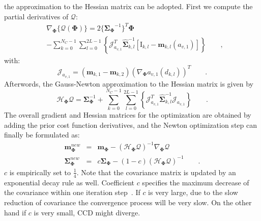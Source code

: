 \documentclass[conference]{IEEEtran}
\begin{document}
the approximation to the Hessian matrix can be adopted. First we
compute the partial derivatives of $\mathcal{Q}$:
\begin{equation}
\label{eq:partcost}
\begin{aligned}
&\nabla_{\mathbf{\Phi}}\{{\mathcal{Q}(\mathbf{\Phi})}\} =
2\{{\mathbf{\Sigma}_{\mathbf{\Phi}}}^{-1}\}^{T}{\mathbf{\Phi}}\\ 
&- \sum_{k = 0}^{N_{C}-1} \sum_{l=0}^{2L-1} \left\{\mathcal{J}_{a_{v,1}}^T\hat{\mathbf{\Sigma}}_{k,l}^{-1}\left[\mathrm{I}_{k,l}-\hat{\mathbf{m}}_{k,l}(a_{v,1})\right]\right\}\qquad,
\end{aligned}
\end{equation}
with:
\begin{equation}
  \label{eq:jocob}
  \mathcal{J}_{a_{v,1}} = \left( \mathbf{m}_{k,1} -\mathbf{m}_{k,2} \right)(\nabla_{\mathbf{\Phi}} a_{v,1}(d_{k,l}))^T\qquad.
\end{equation}
Afterwords, the Gauss-Newton approximation to the Hessian
matrix is given by
\begin{equation}
  \label{eq:hessian}
  \mathcal{H}_{\mathbf{\Phi}} \mathcal{Q}  =
  \mathbf{\Sigma}_{\mathbf{\Phi}}^{-1} + \sum_{k = 0}^{N_{C}-1}
  \sum_{l=0}^{2L-1} \left\{\mathcal{J}_{a_{v,1}}^T\hat{\mathbf{\Sigma}}_{k,l}^{-1}\mathcal{J}_{a_{v,1}}\right\}\qquad.
\end{equation}
The overall gradient and Hessian matrices for the optimization
are obtained by adding the prior cost function
derivatives, and the Newton optimization step can finally be
formulated as:
\begin{eqnarray}
\label{eq:newton}
  \mathbf{m}_{\mathbf{\Phi}}^{new} & = &
  \mathbf{m}_{\mathbf{\Phi}} - (\mathcal{H}_{\mathbf{\Phi}}
  \mathcal{Q})^{-1} \nabla_{\mathbf{\Phi}} \mathcal{Q} \nonumber \\
  \mathbf{\Sigma}_{\mathbf{\Phi}}^{new} & = &
  c\mathbf{\Sigma}_{\mathbf{\Phi}} - (1-c)(\mathcal{H}_{\mathbf{\Phi}}
  \mathcal{Q})^{-1}\qquad.
\end{eqnarray}
$c$ is empirically set to $\frac{1}{4}$. Note that the covariance
matrix is updated by an exponential decay rule as well. Coefficient $c$ specifies the
maximum decrease of the covariance within one iteration
step~\cite{hanek2004contracting}. If $c$ is very large, due to the slow reduction of covariance the
convergence process will be very slow. On the other hand if $c$ is
very small, CCD might diverge.


\end{document}
